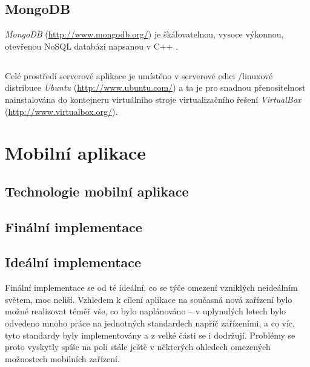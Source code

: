 \subsection{MongoDB}
\emph{MongoDB} (\url{http://www.mongodb.org/}) je škálovatelnou, vysoce výkonnou, otevřenou NoSQL databází napsanou v C++ \cite{Mongo}.

\subsection*{ }
Celé prostředí serverové aplikace je umístěno v serverové edici /linuxové distribuce \emph{Ubuntu} (\url{http://www.ubuntu.com/}) a ta je pro snadnou přenositelnost nainstalována do kontejneru virtuálního stroje virtualizačního řešení \emph{VirtualBox} (\url{http://www.virtualbox.org/}).





\section{Mobilní aplikace}

\subsection{Technologie mobilní aplikace}


\subsection{Finální implementace}

\subsection{Ideální implementace}
Finální implementace se od té ideální, co se týče omezení vzniklých neideálním světem, moc neliší. Vzhledem k cílení aplikace na současná nová zařízení bylo možné realizovat téměř vše, co bylo naplánováno -- v uplynulých letech bylo odvedeno mnoho práce na jednotných standardech napříč zařízeními, a co víc, tyto standardy byly implementovány a z velké části se i dodržují. Problémy se proto vyskytly spíše na poli stále ještě v některých ohledech omezených možnostech mobilních zařízení.

